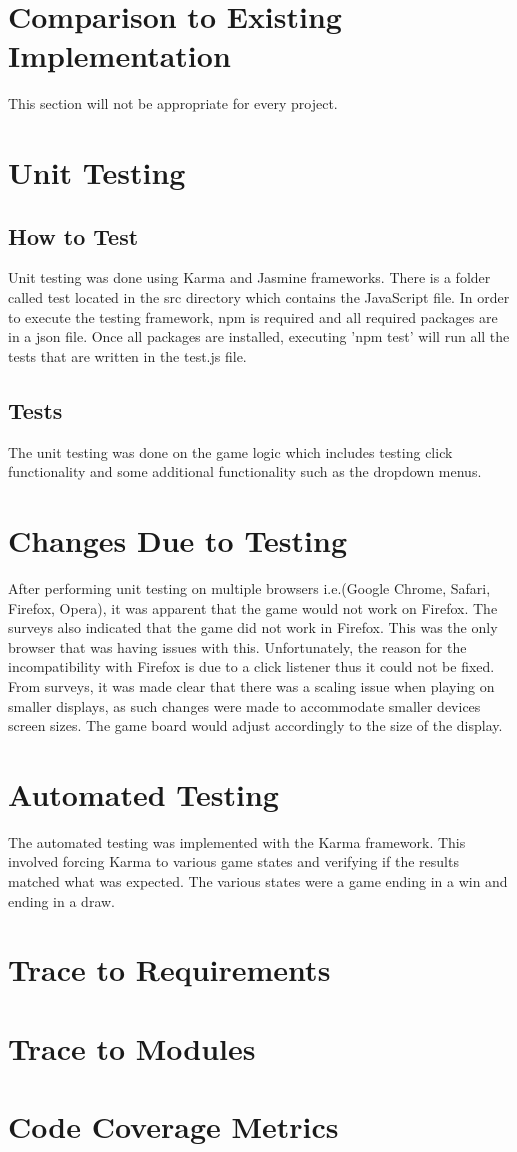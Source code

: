 \documentclass[12pt, titlepage]{article}
\begin{document}
\section{Comparison to Existing Implementation}	

This section will not be appropriate for every project.

\section{Unit Testing}
\subsection{How to Test}
Unit testing was done using Karma and Jasmine frameworks. There is a folder called test
located in the src directory which contains the JavaScript file. In order to execute the testing framework, 
npm is required and all required packages are in a json file. Once all packages are installed, 
executing 'npm test' will run all the tests that are written in the test.js file.
\subsection{Tests}
The unit testing was done on the game logic which includes testing click functionality and some additional functionality such as the dropdown menus.

\section{Changes Due to Testing}
After performing unit testing on multiple browsers i.e.(Google Chrome, Safari, Firefox, Opera),
it was apparent that the game would not work on Firefox. The surveys also indicated that the game did
not work in Firefox. This was the only browser that was having issues with this. Unfortunately,
the reason for the incompatibility with Firefox is due to a click listener thus it could not be fixed. From
surveys, it was made clear that there was a scaling issue when playing on smaller displays, as such
changes were made to accommodate smaller devices screen sizes. The game board would adjust 
accordingly to the size of the display. 
\section{Automated Testing}
The automated testing was implemented with the Karma framework. This involved forcing Karma
to various game states and verifying if the results matched what was expected. The various 
states were a game ending in a win and ending in a draw.
\section{Trace to Requirements}
		
\section{Trace to Modules}		

\section{Code Coverage Metrics}




\end{document}

